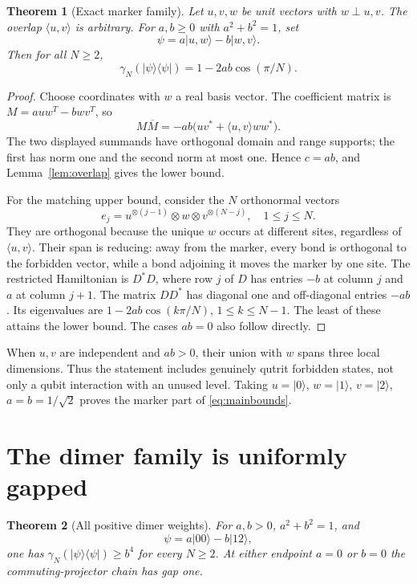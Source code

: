 \documentclass[11pt,a4paper]{article}
\newtheorem{theorem}{Theorem}[section]
\theoremstyle{remark}\newtheorem{remark}[theorem]{Remark}
\newcommand{\ket}[1]{\lvert #1\rangle}
\newcommand{\bra}[1]{\langle #1\rvert}
\begin{document}
\begin{theorem}[Exact marker family]\label{thm:marker}
Let $u,v,w$ be unit vectors with $w\perp u,v$. The overlap $\langle u,v\rangle$ is arbitrary. For $a,b\ge0$ with $a^2+b^2=1$, set
\begin{equation}\label{eq:marker-family}
 \psi=a\ket{u,w}-b\ket{w,v}.
\end{equation}
Then for all $N\ge2$,
\begin{equation}\label{eq:marker-exact}
 \gamma_N(\ket\psi\bra\psi)=1-2ab\cos(\pi/N).
\end{equation}
\end{theorem}
\begin{proof}
Choose coordinates with $w$ a real basis vector. The coefficient matrix is
$M=a u w^T-b w v^T$, so
\[
 M\overline M=-ab\bigl(u v^*+\langle u,v\rangle w w^*\bigr).
\]
The two displayed summands have orthogonal domain and range supports; the first has norm one and the second norm at most one. Hence $c=ab$, and Lemma~\ref{lem:overlap} gives the lower bound.

For the matching upper bound, consider the $N$ orthonormal vectors
\[
 e_j=u^{\otimes(j-1)}\otimes w\otimes v^{\otimes(N-j)},\quad 1\le j\le N.
\]
They are orthogonal because the unique $w$ occurs at different sites, regardless of $\langle u,v\rangle$. Their span is reducing: away from the marker, every bond is orthogonal to the forbidden vector, while a bond adjoining it moves the marker by one site. The restricted Hamiltonian is $D^*D$, where row $j$ of $D$ has entries $-b$ at column $j$ and $a$ at column $j+1$. The matrix $DD^*$ has diagonal one and off-diagonal entries $-ab$. Its eigenvalues are
$1-2ab\cos(k\pi/N)$, $1\le k\le N-1$. The least of these attains the lower bound. The cases $ab=0$ also follow directly.
\end{proof}
When $u,v$ are independent and $ab>0$, their union with $w$ spans three local dimensions. Thus the statement includes genuinely qutrit forbidden states, not only a qubit interaction with an unused level. Taking $u=\ket0$, $w=\ket1$, $v=\ket2$, $a=b=1/\sqrt2$ proves the marker part of \eqref{eq:mainbounds}.

\section{The dimer family is uniformly gapped}\label{sec:dimer}
\begin{theorem}[All positive dimer weights]\label{thm:dimer}
For $a,b>0$, $a^2+b^2=1$, and
\begin{equation}\label{eq:dimer-family}
 \psi=a\ket{00}-b\ket{12},
\end{equation}
one has $\gamma_N(\ket\psi\bra\psi)\ge b^4$ for every $N\ge2$.
At either endpoint $a=0$ or $b=0$ the commuting-projector chain has gap one.
\end{theorem}
\end{document}

